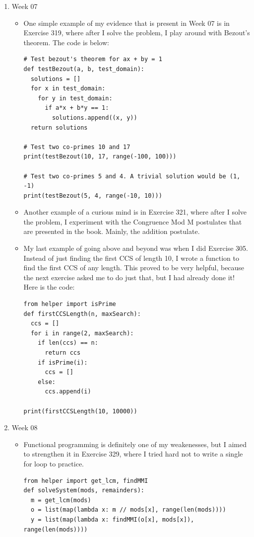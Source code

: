 \documentclass[11pt]{article}
\begin{document}
\begin{enumerate}
\item Week 07
\begin{itemize}
\item One simple example of my evidence that is present in Week 07 is in Exercise 319, where after I solve
the problem, I play around with Bezout's theorem. The code is below:
\begin{verbatim}
# Test bezout's theorem for ax + by = 1
def testBezout(a, b, test_domain):
  solutions = []
  for x in test_domain:
    for y in test_domain:
      if a*x + b*y == 1:
        solutions.append((x, y))
  return solutions

# Test two co-primes 10 and 17
print(testBezout(10, 17, range(-100, 100)))

# Test two co-primes 5 and 4. A trivial solution would be (1, -1)
print(testBezout(5, 4, range(-10, 10)))
\end{verbatim}

\item Another example of a curious mind is in Exercise 321, where after I solve the problem, I experiment
with the Congruence Mod M postulates that are presented in the book. Mainly, the addition postulate.

\item My last example of going above and beyond was when I did Exercise 305. Instead of just finding the
first CCS of length 10, I wrote a function to find the first CCS of any length. This proved to be
very helpful, because the next exercise asked me to do just that, but I had already done it! Here
is the code:
\begin{verbatim}
from helper import isPrime
def firstCCSLength(n, maxSearch):
  ccs = []
  for i in range(2, maxSearch):
    if len(ccs) == n:
      return ccs
    if isPrime(i):
      ccs = []
    else:
      ccs.append(i)

print(firstCCSLength(10, 10000))
\end{verbatim}
\end{itemize}

\item Week 08
\begin{itemize}
\item Functional programming is definitely one of my weakenesses, but I aimed to strengthen it in
Exercise 329, where I tried hard not to write a single for loop to practice.
\begin{verbatim}
from helper import get_lcm, findMMI
def solveSystem(mods, remainders):
  m = get_lcm(mods)
  o = list(map(lambda x: m // mods[x], range(len(mods))))
  y = list(map(lambda x: findMMI(o[x], mods[x]), range(len(mods))))


\end{verbatim}
\end{itemize}
\end{enumerate}
\end{document}
